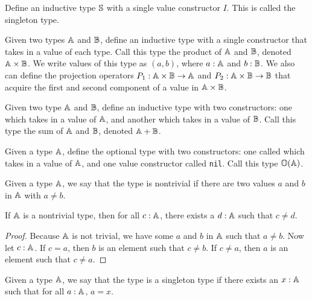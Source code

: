 \documentclass[../math.tex]{subfiles}
\begin{document}
\begin{definition}
    Define an inductive type $\S$ with a single value constructor $I$.  This is
    called the singleton type.
\end{definition}

\begin{definition}
    Given two types $\A$ and $\B$, define an inductive type with a single
    constructor that takes in a value of each type.  Call this type the product
    of $\A$ and $\B$, denoted $\A \times \B$.  We write values of this type as
    $(a, b)$, where $a : \A$ and $b : \B$.  We also can define the projection
    operators $P_1 : \A \times \B \rightarrow \A$ and $P_2 : \A \times \B
    \rightarrow \B$ that acquire the first and second component of a value in
    $\A \times \B$.
\end{definition}

\begin{definition}
    Given two type $\A$ and $\B$, define an inductive type with two
    constructors: one which takes in a value of $\A$, and another which takes in
    a value of $\B$.  Call this type the sum of $\A$ and $\B$, denoted $\A +
    \B$.
\end{definition}

\begin{definition}
    Given a type $\A$, define the optional type with two constructors: one
    called  which takes in a value of $\A$, and one value constructor
    called \verb|nil|.  Call this type $\O(\A)$.
\end{definition}

\begin{class}
    Given a type $\A$, we say that the type is nontrivial if there are two
    values $a$ and $b$ in $\A$ with $a \neq b$.
\end{class}

\begin{theorem} \label{not-trivial2}
    If $\A$ is a nontrivial type, then for all $c : \A$, there exists a $d : \A$
    such that $c \neq d$.
\end{theorem}
\begin{proof}
    Because $\A$ is not trivial, we have some $a$ and $b$ in $\A$ such that $a
    \neq b$.  Now let $c : \A$.  If $c = a$, then $b$ is an element such that $c
    \neq b$.  If $c \neq a$, then $a$ is an element such that $c \neq a$.
\end{proof}

\begin{class}
    Given a type $\A$, we say that the type is a singleton type if there exists
    an $x : \A$ such that for all $a : \A$, $a = x$.
\end{class}
\end{document}
